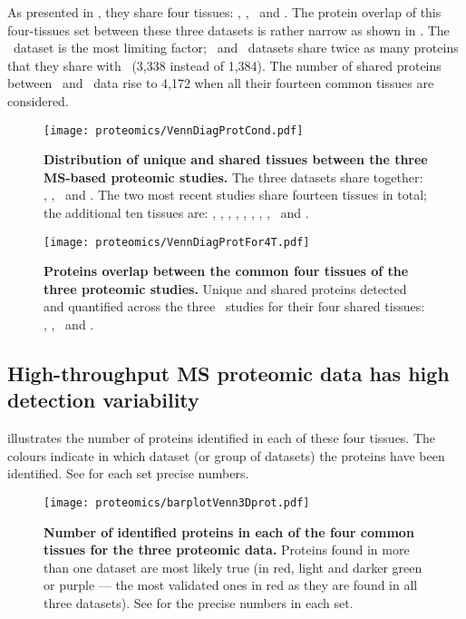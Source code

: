 As presented in ,
they share four tissues: \heart, \lung, \ovary\ and \pancreas.
The protein overlap of this four-tissues set between these three datasets
is rather narrow as shown in .
The \cutler\ dataset is the most limiting factor;
\pandey\ and \kuster\ datasets share twice as many proteins
that they share with \cutler\ (3,338 instead of 1,384).
The number of shared proteins between \pandey\ and \kuster\ data rise to 4,172
when all their fourteen common tissues are considered.

\begin{figure}[!htpb]
    \texttt{[image: proteomics/VennDiagProtCond.pdf]}\centering
    \caption[Distribution of unique shared tissues between
    the 3 MS-based proteomic studies]{\label{fig:VennDiagProt3}\textbf{Distribution
    of unique and shared tissues between the three MS-based proteomic studies.}
    The three datasets share together: \heart, \lung, \ovary\ and \pancreas.
    The two most recent studies share fourteen tissues in total;
    the additional ten tissues are: \adrenal, \hcolon, \gallbladder,
    \oesophagus, \kidney, \liver, \placenta, \prostate, \rectum\ and \testis.}
\end{figure}
\vspace{1cm}
\begin{figure}[!htpb]
    \texttt{[image: proteomics/VennDiagProtFor4T.pdf]}\centering
    \caption[Proteins overlap between the common tissues of
    the 3 proteomic studies]{\label{fig:VennProtComm}\textbf{Proteins
    overlap between the common four tissues of the three proteomic studies.}
    Unique and shared proteins detected and quantified
    across the three \ms\ studies for their four shared tissues:
    \heart, \lung, \ovary\ and \pancreas.}
\end{figure}
\clearpage
\subsection{High-throughput MS proteomic data has high detection variability}

illustrates the number of proteins identified in each of these four tissues.
The colours indicate in which dataset (or group of datasets)
the proteins have been identified.
See  for each set precise numbers.

\begin{figure}[!htbp]
    \texttt{[image: proteomics/barplotVenn3Dprot.pdf]}\centering
    \vspace{-3mm}
    \caption[Identified proteins across the 4 shared tissues for the 3 datasets]%
    {\label{fig:barplot3Dvennprot}\textbf{Number of identified
    proteins in each of the four common tissues for the three proteomic data.}
    Proteins found in more than one dataset are most likely true (in
    red, light and darker green or purple --- the most validated ones in red
    as they are found in all three datasets).
    See  for the precise numbers in each set.}
\end{figure}

